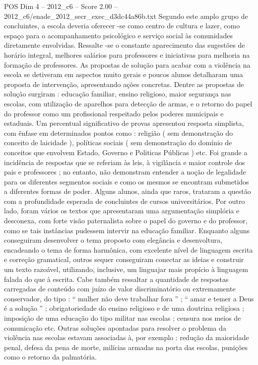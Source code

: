 \begin{textsample}{POS Dim 4 – 2012\_c6 – Score 2.00 – 2012\_c6/enade\_2012\_secr\_exec\_d3dc44a86b.txt}
Segundo este amplo grupo de concluintes, a escola deveria oferecer -se como centro de cultura e lazer, como espaço para o acompanhamento psicológico e serviço social às comunidades diretamente envolvidas.
Ressalte -se o constante aparecimento das sugestões de horário integral, melhores salários para professores e iniciativas para melhoria na formação de professores.
As propostas de solução para acabar com a violência na escola se detiveram em aspectos muito gerais e poucos alunos detalharam uma proposta de intervenção, apresentando ações concretas.
Dentre as propostas de solução surgiram : educação familiar, ensino religioso, maior segurança nas escolas, com utilização de aparelhos para detecção de armas, e o retorno do papel do professor como um profissional respeitado pelos poderes municipais e estaduais.
Um percentual significativo de provas apresentou resposta simplista, com ênfase em determinados pontos como : religião ( sem demonstração do conceito de laicidade ), políticas sociais ( sem demonstração do domínio de conceitos que envolvem Estado, Governo e Politicas Públicas ) etc.
Foi grande a incidência de respostas que se referiam às leis, à vigilância e maior controle dos pais e professores ; no entanto, não demonstram entender a noção de legalidade para os diferentes segmentos sociais e como os mesmos se encontram submetidos a diferentes formas de poder.
Alguns alunos, ainda que raros, trataram a questão com a profundidade esperada de concluintes de cursos universitários.
Por outro lado, foram vários os textos que apresentaram uma argumentação simplória e desconexa, com forte visão paternalista sobre o papel do governo e do professor, como se tais instâncias pudessem intervir na educação familiar.
Enquanto alguns conseguiram desenvolver o tema proposto com elegância e desenvoltura, encadeando o tema de forma harmônica, com excelente nível de linguagem escrita e correção gramatical, outros sequer conseguiram conectar as ideias e construir um texto razoável, utilizando, inclusive, um linguajar mais propício à linguagem falada do que à escrita.
Cabe também ressaltar a quantidade de respostas carregadas de conteúdo com juízo de valor discriminatório ou extremamente conservador, do tipo : “ mulher não deve trabalhar fora ” ; “ amar e temer a Deus é a solução ” ; obrigatoriedade do ensino religioso e de uma doutrina religiosa ; imposição de uma educação do tipo militar nas escolas ; censura nos meios de comunicação etc.
Outras soluções apontadas para resolver o problema da violência nas escolas estavam associadas à, por exemplo : redução da maioridade penal, defesa da pena de morte, milícias armadas na porta das escolas, punições como o retorno da palmatória.

\end{textsample}
